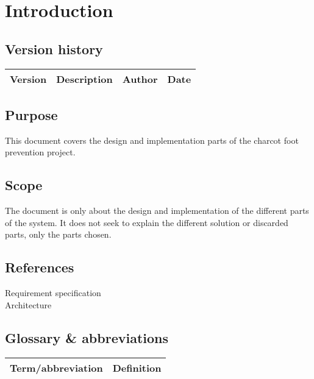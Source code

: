 \chapter{Introduction}
\section{Version history}
\begin{table}[H]
\begin{tabular}{|c|p{9cm}|c|c|}
\hline
Version & Description & Author & Date\\
\hline
\end{tabular}
\end{table}

\section{Purpose}
This document covers the design and implementation parts of the charcot foot prevention project.

\section{Scope}
The document is only about the design and implementation of the different parts of the system. It does not seek to explain the different solution or discarded parts, only the parts chosen.

\section{References}
Requirement specification \\
Architecture \\

\section{Glossary \& abbreviations}
\begin{table}[H]
\centering
\begin{tabular}{|p{4cm}|p{7cm}|}
\hline
Term/abbreviation & Definition\\ \hline
\end{tabular}
\end{table}
